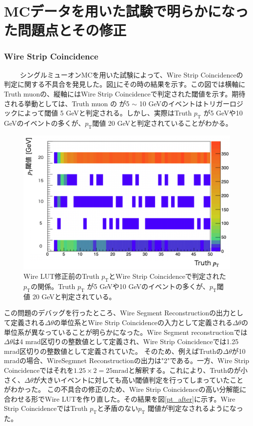 \clearpage
\section{MCデータを用いた試験で明らかになった問題点とその修正}
\label{sec:appendix:MC-test}
\subsubsection{Wire Strip Coincidence}　　
シングルミューオンMCを用いた試験によって、Wire Strip Coincidenceの\pt 判定に関する不具合を発見した。図\ref{pt_before}にその時の結果を示す。この図では横軸にTruth muonの\pt、縦軸にはWire Strip Coincidenceで判定された\pt 閾値を示す。期待される挙動としては、Truth muon の \pt が5 $\sim$ 10 GeVのイベントはトリガーロジックによって\pt 閾値 5 GeVと判定される。しかし、実際はTruth $p_\mathrm{T}$ が5 GeVや10 GeVのイベントの多くが、$p_\mathrm{T}$閾値 20 GeVと判定されていることがわかる。

\begin{figure} 
\centering
\includegraphics[width=16cm]{fig/Test/pt_before.png}
\caption[]{Wire LUT修正前のTruth $p_\mathrm{T}$とWire Strip Coincidenceで判定された$p_\mathrm{T}$の関係。Truth $p_\mathrm{T}$ が5 GeVや10 GeVのイベントの多くが、$p_\mathrm{T}$閾値 20 GeVと判定されている。}
\label{pt_before}
\end{figure}

この問題のデバッグを行ったところ、Wire Segment Reconstructionの出力として定義される$\Delta\theta$の単位系とWire Strip Coincidenceの入力として定義される$\Delta\theta$の単位系が異なっていることが明らかになった。Wire Segment reconstructionでは$\Delta\theta$は4 mrad区切りの整数値として定義され、Wire Strip Coincidenceでは1.25 mrad区切りの整数値として定義されていた。
そのため、例えばTruthの$\Delta\theta$が10 mradの場合、WireSegmnet Reconstructionの出力は"2"である。一方、Wire Strip Coincidenceではそれを$1.25 \times 2 = 25 \mathrm{mrad}$と解釈する。これにより、Truthの\pt が小さく、$\Delta\theta$が大きいイベントに対しても高い\pt 閾値判定を行ってしまっていたことがわかった。
この不具合の修正のため、Wire Strip Coincidenceの高い分解能に合わせる形でWire LUTを作り直した。その結果を図\ref{pt_after}に示す。Wire Strip CoincidenceではTruth $p_\mathrm{T}$と矛盾のない$p_\mathrm{T}$ 閾値が判定なされるようになった。　
 
